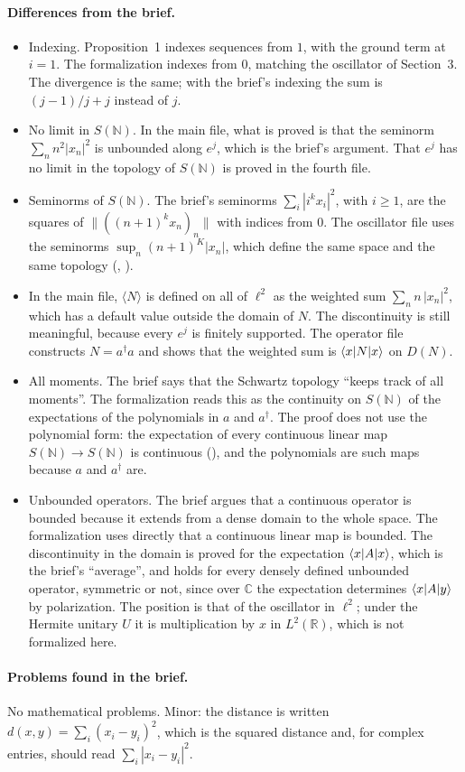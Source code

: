 \documentclass[11pt]{article}
\begin{document}
\paragraph{Differences from the brief.}
\begin{itemize}
\item Indexing. Proposition~1 indexes sequences from $1$, with the ground term at $i = 1$. The
  formalization indexes from $0$, matching the oscillator of Section~3. The divergence is the
  same; with the brief's indexing the sum is $(j-1)/j + j$ instead of $j$.
\item No limit in $S(\mathbb{N})$. In the main file, what is proved is that the seminorm
  $\sum_n n^2 |x_n|^2$ is unbounded along $e^j$, which is the brief's argument. That $e^j$ has
  no limit in the topology of $S(\mathbb{N})$ is proved in the fourth file.
\item Seminorms of $S(\mathbb{N})$. The brief's seminorms $\sum_i |i^k x_i|^2$, with $i \ge 1$,
  are the squares of $\|((n+1)^k x_n)_n\|$ with indices from $0$. The oscillator file uses the
  seminorms $\sup_n (n+1)^K |x_n|$, which define the same space and the same topology
  (, ).
\item In the main file, $\langle N\rangle$ is defined on all of $\ell^2$ as the weighted sum
  $\sum_n n\,|x_n|^2$, which has a default value outside the domain of $N$. The discontinuity
  is still meaningful, because every $e^j$ is finitely supported. The operator file constructs
  $N = a^\dagger a$ and shows that the weighted sum is $\braket{x|N|x}$ on $D(N)$.
\item All moments. The brief says that the Schwartz topology ``keeps track of all moments''.
  The formalization reads this as the continuity on $S(\mathbb{N})$ of the expectations of the
  polynomials in $a$ and $a^\dagger$. The proof does not use the polynomial form: the
  expectation of every continuous linear map $S(\mathbb{N}) \to S(\mathbb{N})$ is continuous
  (), and the polynomials are such maps because $a$
  and $a^\dagger$ are.
\item Unbounded operators. The brief argues that a continuous operator is bounded because it
  extends from a dense domain to the whole space. The formalization uses directly that a
  continuous linear map is bounded. The discontinuity in the domain is proved for the
  expectation $\braket{x|A|x}$, which is the brief's ``average'', and holds for every densely
  defined unbounded operator, symmetric or not, since over $\mathbb{C}$ the expectation
  determines $\braket{x|A|y}$ by polarization. The position is that of the oscillator in
  $\ell^2$; under the Hermite unitary $U$ it is multiplication by $x$ in $L^2(\mathbb{R})$,
  which is not formalized here.
\end{itemize}

\paragraph{Problems found in the brief.} No mathematical problems. Minor: the distance is
written $d(x, y) = \sum_i (x_i - y_i)^2$, which is the squared distance and, for complex
entries, should read $\sum_i |x_i - y_i|^2$.
\end{document}
